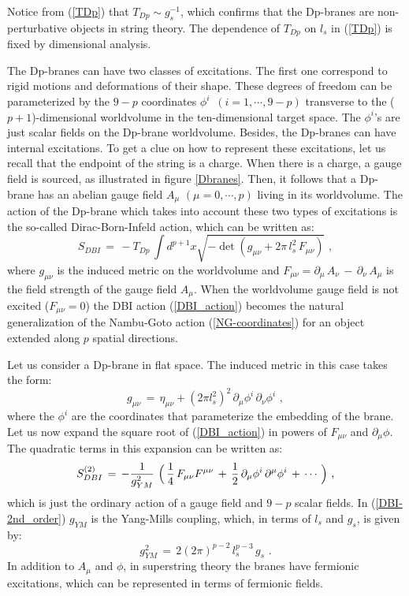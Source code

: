 \documentclass[12pt,notitlepage]{article}
\newcommand{\beq}{\begin{equation}}
\newcommand{\eeq}{\end{equation}}
\begin{document}
Notice from (\ref{TDp}) that $T_{Dp}\sim g_s^{-1}$,  which confirms that the Dp-branes are non-perturbative objects in string theory. The dependence of $T_{Dp}$ on $l_s$ in (\ref{TDp}) is fixed by dimensional analysis. 

The Dp-branes can have two classes of excitations. The first one correspond to  rigid motions and deformations of their shape. These degrees of freedom can be parameterized by the  $9-p$  coordinates $\phi^{i}\,\,\,(i=1,\cdots,9-p)$ transverse to the ($p+1$)-dimensional worldvolume in the ten-dimensional target space. The $\phi^{i}$'s are just  scalar fields on the  Dp-brane worldvolume. Besides, the Dp-branes can have internal excitations. To get a clue on how to represent these excitations, let us recall that the endpoint of the string is a charge. When  there is a charge,  a gauge field is sourced, as illustrated in figure \ref{Dbranes}. Then, it follows that a Dp-brane has an abelian gauge field $A_{\mu}$ $(\mu=0,\cdots, p)$ living  in its worldvolume. The action of the Dp-brane which takes into account these two types of excitations is the so-called Dirac-Born-Infeld action, which can be written as:
\beq
S_{DBI}\,=\,-T_{Dp}\,\int d^{p+1} x \sqrt{-\det (g_{\mu\nu}+2\pi\, l_s^2 \,F_{\mu\nu})}\,\,,
\label{DBI_action}
\eeq
where $g_{\mu\nu}$ is the induced metric on the worldvolume and 
$F_{\mu\nu}=\partial_{\mu}\,A_{\nu}\,-\,\partial_{\nu}\,A_{\mu}$ is the field strength of the gauge field $A_{\mu}$. When the worldvolume gauge field is not excited ($F_{\mu\nu}=0$) the DBI action (\ref{DBI_action}) becomes the natural generalization of the Nambu-Goto action (\ref{NG-coordinates}) for an object extended along $p$ spatial directions. 



Let us consider  a Dp-brane in flat space. The induced metric in this case takes the form:
\beq
g_{\mu\nu}\,=\,\eta_{\mu\nu}+(2\pi l_s^2)^2\,\partial_{\mu}\phi^i\,\partial_{\nu}\phi^i\,\,,
\eeq
where the $\phi^i$ are the coordinates that parameterize the embedding of the brane. 
Let us now expand the square root of (\ref{DBI_action}) in powers of $F_{\mu\nu}$ and $\partial_\mu\phi$.  The quadratic terms in this expansion can be written as:
\beq
S_{DBI}^{(2)}\,=\,-{1\over g^2_{YM}}\,\,
\Big(\,{1\over 4}\,F_{\mu\nu}F^{\mu\nu}\,+\,{1\over 2}\,
\partial_{\mu}\phi^i\,\partial^{\mu}\phi^i\,+\,\cdots\,\Big)\,\,,
\label{DBI-2nd_order}
\eeq
which is just the ordinary action of a gauge field and $9-p$ scalar fields. In (\ref{DBI-2nd_order})
 $g_{YM}$ is the Yang-Mills coupling, which, in terms of $l_s$ and $g_s$, is given by:
\beq
g^2_{YM}\,=\,2(2\pi)^{p-2}\,l_s^{p-3}\,g_s\,\,.
\label{gYM-p}
\eeq
In addition to $A_{\mu}$ and $\phi$, in superstring theory the branes have fermionic excitations, which can be represented in terms of fermionic fields.
\end{document}
